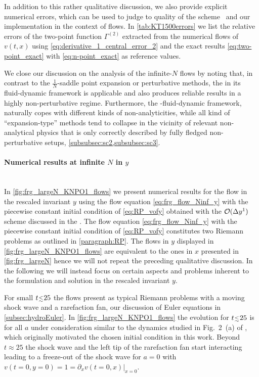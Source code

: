 In addition to this rather qualitative discussion, we also provide explicit numerical errors, which can be used to judge to quality of the \kt{} scheme~\cite{KTO2-0} and our implementation in the context of \frg{} flows. 
In \cref{tab:KT1500errors} we list the relative errors of the \ipi{} two-point function $\Gamma^{(2)}$ extracted from the numerical \frg{} flows of $v ( t, x )$ using \cref{eq:derivative_1_central_error_2} and the exact results \eqref{eq:two-point_exact} with \eqref{eq:n-point_exact} as reference values.

We close our discussion on the analysis of the infinite-$N$ \frg{} flows by noting that, in contrast to the $\tfrac{1}{N}$-saddle point expansion or perturbative methods, the \frg{} in its fluid-dynamic framework is applicable and also produces reliable results in a highly non-perturbative regime.
Furthermore, the \frg{}-fluid-dynamic framework, naturally copes with different kinds of non-analyticities, while all kind of ``expansion-type'' methods tend to collapse in the vicinity of relevant non-analytical physics that is only correctly described by fully fledged non-perturbative setups, \cf{} \cref{subsubsec:sc2,subsubsec:sc3}.

\paragraph{Numerical results at infinite \texorpdfstring{$N$}{N} in \texorpdfstring{$y$}{y}}\label{paragraph:infiniteNflowsY}\mbox{}\\%
In \cref{fig:frg_largeN_KNPO1_flows} we present numerical results for the \frg{} flow in the rescaled invariant $y$ using the flow equation \eqref{eq:frg_flow_Ninf_y} with the piecewise constant initial condition of \cref{eq:RP_vofy} obtained with the \knp{} $\mathcal{O} ( \Delta y^1 )$ scheme discussed in the .
The flow equation \eqref{eq:frg_flow_Ninf_y} with the piecewise constant initial condition of \cref{eq:RP_vofy} constitutes two Riemann problems as outlined in \cref{paragraph:RP}.
The \frg{} flows in $y$ displayed in \cref{fig:frg_largeN_KNPO1_flows} are equivalent to the ones in $x$ presented in \cref{fig:frg_largeN} hence we will not repeat the preceding qualitative discussion.
In the following we will instead focus on certain aspects and problems inherent to the formulation and solution in the rescaled invariant $y$.\bigskip
	
For small \rgtimes{} $t \smallerlesssim 25$ the \frg{} flows present as typical Riemann problems with a moving shock wave and a rarefaction fan, \cf{} our discussion of Euler equations in \cref{subsec:hydroEuler}. 
In \cref{fig:frg_largeN_KNPO1_flows} the evolution for $t \smallerlesssim 25$ is for all $a$ under consideration similar to the dynamics studied in Fig.~2~(a) of , which originally motivated the chosen initial condition in this work.
Beyond $t \approx 25$ the shock wave and the left tip of the rarefaction fan start interacting leading to a freeze-out of the shock wave for $a = 0$ with ${v ( t = 0, y = 0 ) = 1 = \partial_x v ( t = 0, x ) \big|_{x = 0}}$.

